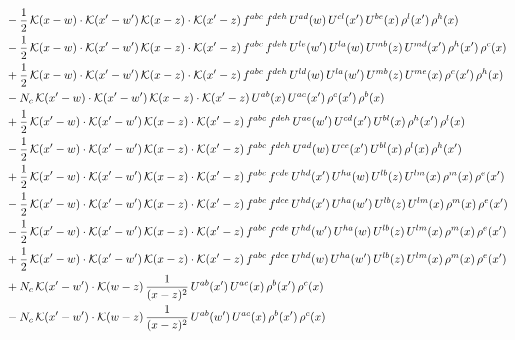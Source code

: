 \documentclass[9pt]{article}
\numberwithin{equation}{section}
\begin{document}
\begin{align}
&-\frac{1}{2}\,\mathcal{K}(x-w)\cdot\mathcal{K}(x'-w')\,\mathcal{K}(x-z)\cdot\mathcal{K}(x'-z)\,f^{abc}\,f^{deh}\,U^{ad}(w)\,U^{cl}(x')\,U^{be}(x)\,\rho^{l}(x')\,\rho^{h}(x)\notag \\ 
&-\frac{1}{2}\,\mathcal{K}(x-w)\cdot\mathcal{K}(x'-w')\,\mathcal{K}(x-z)\cdot\mathcal{K}(x'-z)\,f^{abc}\,f^{deh}\,U^{le}(w')\,U^{la}(w)\,U^{mb}(z)\,U^{md}(x')\,\rho^{h}(x')\,\rho^{c}(x)\notag \\ 
&+\frac{1}{2}\,\mathcal{K}(x-w)\cdot\mathcal{K}(x'-w')\,\mathcal{K}(x-z)\cdot\mathcal{K}(x'-z)\,f^{abc}\,f^{deh}\,U^{ld}(w)\,U^{la}(w')\,U^{mb}(z)\,U^{me}(x)\,\rho^{c}(x')\,\rho^{h}(x)\notag \\ 
&-N_{c}\,\mathcal{K}(x'-w)\cdot\mathcal{K}(x'-w')\,\mathcal{K}(x-z)\cdot\mathcal{K}(x'-z)\,U^{ab}(x)\,U^{ac}(x')\,\rho^{c}(x')\,\rho^{b}(x)\notag \\ 
&+\frac{1}{2}\,\mathcal{K}(x'-w)\cdot\mathcal{K}(x'-w')\,\mathcal{K}(x-z)\cdot\mathcal{K}(x'-z)\,f^{abc}\,f^{deh}\,U^{ae}(w')\,U^{cd}(x')\,U^{bl}(x)\,\rho^{h}(x')\,\rho^{l}(x)\notag \\ 
&-\frac{1}{2}\,\mathcal{K}(x'-w)\cdot\mathcal{K}(x'-w')\,\mathcal{K}(x-z)\cdot\mathcal{K}(x'-z)\,f^{abc}\,f^{deh}\,U^{ad}(w)\,U^{ce}(x')\,U^{bl}(x)\,\rho^{l}(x)\,\rho^{h}(x')\notag \\ 
&+\frac{1}{2}\,\mathcal{K}(x'-w)\cdot\mathcal{K}(x'-w')\,\mathcal{K}(x-z)\cdot\mathcal{K}(x'-z)\,f^{abc}\,f^{cde}\,U^{hd}(x')\,U^{ha}(w)\,U^{lb}(z)\,U^{lm}(x)\,\rho^{m}(x)\,\rho^{e}(x')\notag \\ 
&-\frac{1}{2}\,\mathcal{K}(x'-w)\cdot\mathcal{K}(x'-w')\,\mathcal{K}(x-z)\cdot\mathcal{K}(x'-z)\,f^{abc}\,f^{dce}\,U^{hd}(x')\,U^{ha}(w')\,U^{lb}(z)\,U^{lm}(x)\,\rho^{m}(x)\,\rho^{e}(x')\notag \\ 
&-\frac{1}{2}\,\mathcal{K}(x'-w)\cdot\mathcal{K}(x'-w')\,\mathcal{K}(x-z)\cdot\mathcal{K}(x'-z)\,f^{abc}\,f^{cde}\,U^{hd}(w')\,U^{ha}(w)\,U^{lb}(z)\,U^{lm}(x)\,\rho^{m}(x)\,\rho^{e}(x')\notag \\ 
&+\frac{1}{2}\,\mathcal{K}(x'-w)\cdot\mathcal{K}(x'-w')\,\mathcal{K}(x-z)\cdot\mathcal{K}(x'-z)\,f^{abc}\,f^{dce}\,U^{hd}(w)\,U^{ha}(w')\,U^{lb}(z)\,U^{lm}(x)\,\rho^{m}(x)\,\rho^{e}(x')\notag \\ 
&+N_{c}\,\mathcal{K}(x'-w')\cdot\mathcal{K}(w-z)\,\frac{1}{(x-z)^{2}}\,U^{ab}(x')\,U^{ac}(x)\,\rho^{b}(x')\,\rho^{c}(x)\notag \\ 
&-N_{c}\,\mathcal{K}(x'-w')\cdot\mathcal{K}(w-z)\,\frac{1}{(x-z)^{2}}\,U^{ab}(w')\,U^{ac}(x)\,\rho^{b}(x')\,\rho^{c}(x)\notag \\ 

\end{align}
\end{document}
